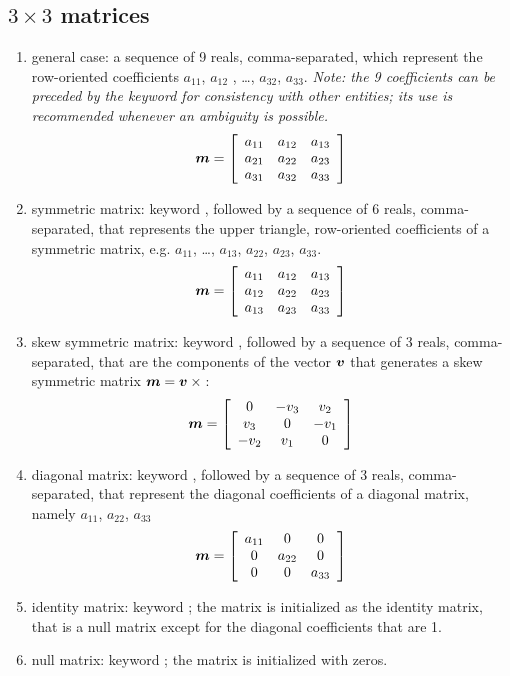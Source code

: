 \subsection{$3 \times 3$ matrices}
\begin{enumerate}
    \item general case: a sequence of 9 reals, comma-separated, which
    represent the row-oriented coefficients $ a_{11} $, $ a_{12}$ ,
    \ldots, $ a_{32} $, $ a_{33} $.
    \emph{Note: the 9 coefficients can be preceded by the keyword
     for consistency with other entities; its use is recommended
    whenever an ambiguity is possible.}
\begin{equation}
	\T{m} = \sqbr{\matr{ccc}{
		a_{11} & a_{12} & a_{13} \\
		a_{21} & a_{22} & a_{23} \\
		a_{31} & a_{32} & a_{33}
	}}
\end{equation}
    \item symmetric matrix: keyword , followed by a sequence
    of 6 reals, comma-separated, that represents the upper triangle, 
    row-oriented coefficients of a symmetric matrix, 
    e.g. $ a_{11} $, \ldots , $ a_{13} $, $ a_{22} $, $ a_{23} $, $ a_{33} $.
\begin{equation}
	\T{m} = \sqbr{\matr{ccc}{
		a_{11} & a_{12} & a_{13} \\
		a_{12} & a_{22} & a_{23} \\
		a_{13} & a_{23} & a_{33}
	}}
\end{equation}
    \item skew symmetric matrix: keyword , followed by a sequence
    of 3 reals, comma-separated, that are the components of the vector $\T{v}$
    that generates a skew symmetric matrix $\T{m}=\T{v}\times{}$:
\begin{equation}
	\T{m} = \sqbr{\matr{ccc}{
		0 & -v_3 & v_2 \\
		v_3 & 0 & -v_1 \\
		-v_2 & v_1 & 0
	}}
\end{equation}
    \item diagonal matrix: keyword , followed by a sequence
    of 3 reals, comma-separated, that represent the diagonal coefficients 
    of a diagonal matrix, namely $a_{11}$, $a_{22}$, $a_{33}$
\begin{equation}
	\T{m} = \sqbr{\matr{ccc}{
		a_{11} & 0 & 0 \\
		0 & a_{22} & 0 \\
		0 & 0 & a_{33}
	}}
\end{equation}
    \item identity matrix: keyword ; the matrix is initialized
    as the identity matrix, that is a null matrix except for the diagonal 
    coefficients that are 1.
    \item null matrix: keyword ; the matrix is initialized 
    with zeros.
\end{enumerate}
